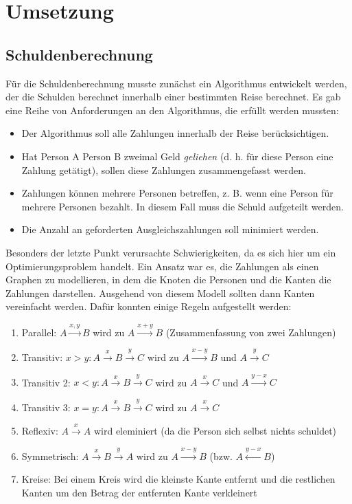 \section {Umsetzung}

\subsection{Schuldenberechnung}

Für die Schuldenberechnung musste zunächst ein Algorithmus entwickelt werden, der die Schulden berechnet innerhalb einer bestimmten Reise berechnet.
Es gab eine Reihe von Anforderungen an den Algorithmus, die erfüllt werden mussten:

\begin{itemize}
\item Der Algorithmus soll alle Zahlungen innerhalb der Reise berücksichtigen.
\item Hat Person A Person B zweimal Geld \emph{geliehen} (d. h. für diese Person eine Zahlung getätigt), sollen diese Zahlungen zusammengefasst werden.
\item Zahlungen können mehrere Personen betreffen, z. B. wenn eine Person für mehrere Personen bezahlt. In diesem Fall muss die Schuld aufgeteilt werden.
\item Die Anzahl an geforderten Ausgleichszahlungen soll minimiert werden.
\end{itemize}

Besonders der letzte Punkt verursachte Schwierigkeiten, da es sich hier um ein Optimierungsproblem handelt.
Ein Ansatz war es, die Zahlungen als einen Graphen zu modellieren, in dem die Knoten die Personen und die Kanten die Zahlungen darstellen.
Ausgehend von diesem Modell sollten dann Kanten vereinfacht werden. Dafür konnten einige Regeln aufgestellt werden:

\begin{enumerate}
    \item Parallel: $A \xrightarrow{x, y} B$ wird zu $A \xrightarrow{x+y} B$ (Zusammenfassung von zwei Zahlungen)
    \item Transitiv: $x>y:A \xrightarrow{x} B \xrightarrow{y} C$ wird zu $A \xrightarrow{x-y} B$ und $A \xrightarrow{y} C$
    \item Transitiv 2: $x<y:A \xrightarrow{x} B \xrightarrow{y} C$ wird zu $A \xrightarrow{x} C$ und $A \xrightarrow{y-x} C$
    \item Transitiv 3: $x=y:A \xrightarrow{x} B \xrightarrow{y} C$ wird zu $A \xrightarrow{x} C$
    \item Reflexiv: $A \xrightarrow{x} A$ wird eleminiert (da die Person sich selbst nichts schuldet)
    \item Symmetrisch: $A \xrightarrow{x} B \xrightarrow{y} A$ wird zu $A \xrightarrow{x-y} B$ (bzw. $A \xleftarrow{y-x} B$)
    \item Kreise: Bei einem Kreis wird die kleinste Kante entfernt und die restlichen Kanten um den Betrag der entfernten Kante verkleinert
\end{enumerate}

